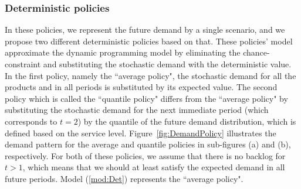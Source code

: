 \documentclass[10pt]{article}
\newcommand{\ti}{t} %
\begin{document}
  
\subsubsection{Deterministic policies}

In these policies, we represent the future demand by a single scenario, and we propose two different deterministic policies based on that. 
These policies' model approximate the dynamic programming model
by eliminating the chance-constraint and substituting the stochastic demand  with the deterministic value.
In the first policy, namely the ``average policy", the stochastic demand for all the products and in all periods is substituted by its expected value. The second policy which is called the ``quantile policy" differs from the ``average policy" by substituting the stochastic demand for the next immediate period (which corresponds to $\ti =2$) by the quantile of the future demand distribution, which is defined based on the service level. Figure~\ref{fig:DemandPolicy} illustrates the demand pattern for the average and quantile policies in sub-figures (a) and (b), respectively. For both of these policies, we assume that there is no backlog for $\ti > 1$, which means that we should at least satisfy the expected demand in all future periods.
Model (\ref{mod:Det}) represents the ``average policy".
\end{document}
